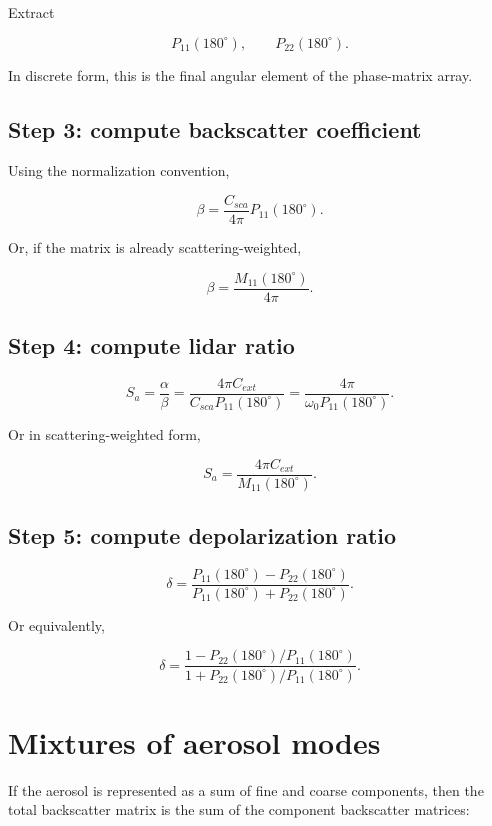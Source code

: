 \documentclass[
  letterpaper,
]{scrbook}
\begin{document}
Extract

\[
P_{11}(180^\circ), \qquad P_{22}(180^\circ).
\]

In discrete form, this is the final angular element of the phase-matrix
array.

\subsection{Step 3: compute backscatter
coefficient}\label{step-3-compute-backscatter-coefficient}

Using the normalization convention,

\[
\beta = \frac{C_{sca}}{4\pi} P_{11}(180^\circ).
\]

Or, if the matrix is already scattering-weighted,

\[
\beta = \frac{M_{11}(180^\circ)}{4\pi}.
\]

\subsection{Step 4: compute lidar
ratio}\label{step-4-compute-lidar-ratio}

\[
S_a = \frac{\alpha}{\beta}
= \frac{4\pi C_{ext}}{C_{sca}P_{11}(180^\circ)}
= \frac{4\pi}{\omega_0 P_{11}(180^\circ)}.
\]

Or in scattering-weighted form,

\[
S_a = \frac{4\pi C_{ext}}{M_{11}(180^\circ)}.
\]

\subsection{Step 5: compute depolarization
ratio}\label{step-5-compute-depolarization-ratio}

\[
\delta =
\frac{P_{11}(180^\circ)-P_{22}(180^\circ)}
{P_{11}(180^\circ)+P_{22}(180^\circ)}.
\]

Or equivalently,

\[
\delta =
\frac{1-P_{22}(180^\circ)/P_{11}(180^\circ)}
{1+P_{22}(180^\circ)/P_{11}(180^\circ)}.
\]

\section{Mixtures of aerosol modes}\label{mixtures-of-aerosol-modes}

If the aerosol is represented as a sum of fine and coarse components,
then the total backscatter matrix is the sum of the component
backscatter matrices:
\end{document}
